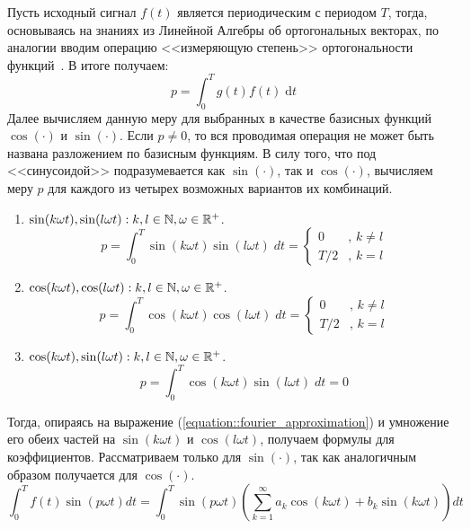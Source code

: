 Пусть исходный сигнал $f(t)$ является периодическим с периодом $T$, тогда, основываясь на знаниях из Линейной Алгебры об ортогональных векторах, по аналогии вводим операцию <<измеряющую степень>> ортогональности функций~\cite{penn2016orthogonal}. В итоге получаем:
\begin{equation}
	p = \int_0^T g(t) f(t) \; \text{d}t
\end{equation}
\indent Далее вычисляем данную меру для выбранных в качестве базисных функций $\cos(\cdot)$ и $\sin(\cdot)$. Если $p \ne 0$, то вся проводимая операция не может быть названа разложением по базисным функциям. В силу того, что под <<синусоидой>> подразумевается как $\sin(\cdot)$, так и $\cos(\cdot)$, вычисляем меру $p$ для каждого из четырех возможных вариантов их комбинаций.
\begin{enumerate}
	\item $\sin(k\omega t), \sin(l \omega t): k, l \in \mathbb{N}, \omega \in \mathbb{R}^+$.
	\begin{equation}
		p = \int_{0}^T \sin(k\omega t)\sin(l \omega t) \; dt =
		\left\{
		\begin{array}{rl}
			0 & \text{, } k \ne l\\
			T / 2 & \text{, } k = l
		\end{array}
		\right.
	\end{equation}
	
	\item $\cos(k\omega t), \cos(l \omega t): k, l \in \mathbb{N}, \omega \in \mathbb{R}^+$.
	\begin{equation}
		p = \int_{0}^T \cos(k\omega t)\cos(l \omega t) \; dt =
		\left\{
		\begin{array}{rl}
			0 & \text{, } k \ne l\\
			T / 2 & \text{, } k = l
		\end{array}
		\right.
	\end{equation}
	
	\item $\cos(k\omega t), \sin(l \omega t): k, l \in \mathbb{N}, \omega \in \mathbb{R}^+$.
	\begin{equation}
		p = \int_{0}^T \cos(k\omega t)\sin(l \omega t) \; dt = 0
	\end{equation}
\end{enumerate}
Тогда, опираясь на  выражение (\ref{equation::fourier_approximation}) и умножение его обеих частей на $\sin(k\omega t)$ и $\cos(l \omega t)$, получаем формулы для коэффициентов. Рассматриваем только для $\sin(\cdot)$, так как аналогичным образом получается для $\cos(\cdot)$.
\begin{equation}
	\int_{0}^T f(t) \sin(p \omega t) dt = \int_0^T \sin(p \omega t) \left(\sum_{k = 1}^{\infty} a_k\cos(k \omega t) + b_k\sin(k \omega t) \right) dt
\end{equation}

